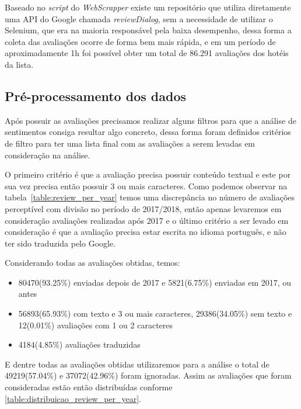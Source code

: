 Baseado no \emph{script} do \emph{WebScrapper} existe um repositório que utiliza diretamente uma API do Google chamada \emph{reviewDialog}, sem a necessidade de utilizar o Selenium, que era na maioria responsável pela baixa desempenho, dessa forma a coleta das avaliações ocorre de forma bem mais rápida, e em um período de aproximadamente 1h foi possível obter um total de 86.291 avaliações dos hotéis da lista.

\subsection{Pré-processamento dos dados}
\label{cap:metodologia:sec:conjunto_dados:sec:pre_processamento}

Após possuir as avaliações precisamos realizar alguns filtros para que a análise de sentimentos consiga resultar algo concreto, dessa forma foram definidos critérios de filtro para ter uma lista final com as avaliações a serem levadas em consideração na análise.

O primeiro critério é que a avaliação precisa possuir conteúdo textual e este por sua vez precisa então possuir 3 ou mais caracteres. Como podemos observar na tabela~\ref{table:review_per_year} temos uma discrepância no número de avaliações perceptível com divisão no período de 2017/2018, então apenas levaremos em consideração avaliações realizadas após 2017 e o último critério a ser levado em consideração é que a avaliação precisa estar escrita no idioma português, e não ter sido traduzida pelo Google.



Considerando todas as avaliações obtidas, temos:

\begin{itemize}
	\item 80470(93.25\%) enviadas depois de 2017 e 5821(6.75\%) enviadas em 2017, ou antes
	\item 56893(65.93\%) com texto e 3 ou mais caracteres, 29386(34.05\%) sem texto e 12(0.01\%) avaliações com 1 ou 2 caracteres
	\item 4184(4.85\%) avaliações traduzidas
\end{itemize}

E dentre todas as avaliações obtidas utilizaremos para a análise o total de 49219(57.04\%) e 37072(42.96\%) foram ignoradas. Assim as avaliações que foram consideradas estão então distribuídas conforme \ref{table:distribuicao_review_per_year}.


